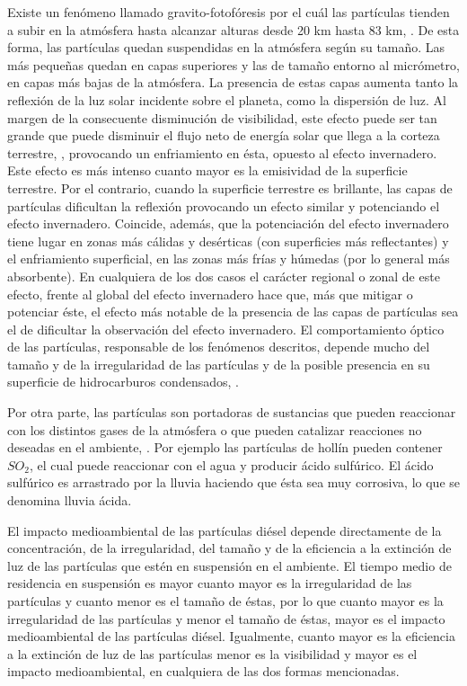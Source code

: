 \par Existe un fenómeno llamado gravito-fotofóresis por el cuál las partículas tienden a subir en la atmósfera hasta alcanzar alturas desde 20 km hasta 83 km, \cite{cheremisinetal:2005}. De esta forma, las partículas quedan suspendidas en la atmósfera según su tamaño. Las más pequeñas quedan en capas superiores y las de tamaño entorno al micrómetro, en capas más bajas de la atmósfera. La presencia de estas capas aumenta tanto la reflexión de la luz solar incidente sobre el planeta, como la dispersión de luz. Al margen de la consecuente disminución de visibilidad, este efecto puede ser tan grande que puede disminuir el flujo neto de energía solar que llega a la corteza terrestre, \cite{faxvogetal:1978}, provocando un enfriamiento en ésta, opuesto al efecto invernadero. Este efecto es más intenso cuanto mayor es la emisividad de la superficie terrestre. Por el contrario, cuando la superficie terrestre es brillante, las capas de partículas dificultan la reflexión provocando un efecto similar y potenciando el efecto invernadero. Coincide, además, que la potenciación del efecto invernadero tiene lugar en zonas más cálidas y desérticas (con superficies más reflectantes) y el enfriamiento superficial, en las zonas más frías y húmedas (por lo general más absorbente). En cualquiera de los dos casos el carácter regional o zonal de este efecto, frente al global del efecto invernadero hace que, más que mitigar o potenciar éste, el efecto más notable de la presencia de las capas de partículas sea el de dificultar la observación del efecto invernadero. El comportamiento óptico de las partículas, responsable de los fenómenos descritos, depende mucho del tamaño y de la irregularidad de las partículas y de la posible presencia en su superficie de hidrocarburos condensados, \cite{siegmannetal:1999}.

\par Por otra parte, las partículas son portadoras de sustancias que pueden reaccionar con los distintos gases de la atmósfera o que pueden catalizar reacciones no deseadas en el ambiente, \cite{merolaetal:2001}. Por ejemplo las partículas de hollín pueden contener $SO_2$, el cual puede reaccionar con el agua y producir ácido sulfúrico. El ácido sulfúrico es arrastrado por la lluvia haciendo que ésta sea muy corrosiva, lo que se denomina lluvia ácida.

\par El impacto medioambiental de las partículas diésel depende directamente de la concentración, de la irregularidad, del tamaño y de la eficiencia a la extinción de luz de las partículas que estén en suspensión en el ambiente. El tiempo medio de residencia en suspensión es mayor cuanto mayor es la irregularidad de las partículas y cuanto menor es el tamaño de éstas, por lo que cuanto mayor es la irregularidad de las partículas y menor el tamaño de éstas, mayor es el impacto medioambiental de las partículas diésel. Igualmente, cuanto mayor es la eficiencia a la extinción de luz de las partículas menor es la visibilidad y mayor es el impacto medioambiental, en cualquiera de las dos formas mencionadas. 
 
\newpage
		

